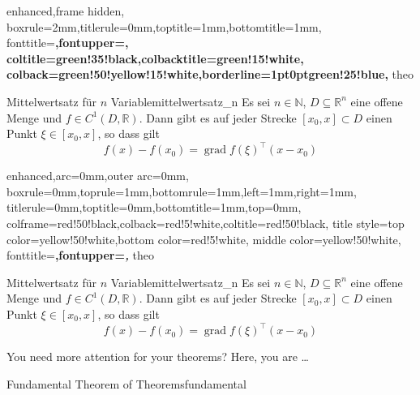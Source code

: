 \begin{dispExample}
%
  {enhanced,frame hidden,
  boxrule=2mm,titlerule=0mm,toptitle=1mm,bottomtitle=1mm,
  fonttitle=\bfseries\large,fontupper=\normalsize,
  coltitle=green!35!black,colbacktitle=green!15!white,
  colback=green!50!yellow!15!white,borderline={1pt}{0pt}{green!25!blue},
  }{theo}

\begin{YetAnotherTheorem}{Mittelwertsatz f\"{u}r $n$ Variable}{mittelwertsatz_n}%
  Es sei $n\in\mathbb{N}$, $D\subseteq\mathbb{R}^n$ eine offene Menge und
  $f\in C^{1}(D,\mathbb{R})$. Dann gibt es auf jeder Strecke
  $[x_0,x]\subset D$ einen Punkt $\xi\in[x_0,x]$, so dass gilt
  \begin{equation*}
  f(x)-f(x_0) = \operatorname{grad} f(\xi)^{\top}(x-x_0)
  \end{equation*}
\end{YetAnotherTheorem}
\end{dispExample}


\begin{dispExample}
%
  {enhanced,arc=0mm,outer arc=0mm,
  boxrule=0mm,toprule=1mm,bottomrule=1mm,left=1mm,right=1mm,
  titlerule=0mm,toptitle=0mm,bottomtitle=1mm,top=0mm,
  colframe=red!50!black,colback=red!5!white,coltitle=red!50!black,
  title style={top color=yellow!50!white,bottom color=red!5!white,
    middle color=yellow!50!white},
  fonttitle=\bfseries\sffamily\normalsize,fontupper=\normalsize\itshape,
  }{theo}

\begin{YetAnotherTheorem}{Mittelwertsatz f\"{u}r $n$ Variable}{mittelwertsatz_n}%
  Es sei $n\in\mathbb{N}$, $D\subseteq\mathbb{R}^n$ eine offene Menge und
  $f\in C^{1}(D,\mathbb{R})$. Dann gibt es auf jeder Strecke
  $[x_0,x]\subset D$ einen Punkt $\xi\in[x_0,x]$, so dass gilt
  \begin{equation*}
  f(x)-f(x_0) = \operatorname{grad} f(\xi)^{\top}(x-x_0)
  \end{equation*}
\end{YetAnotherTheorem}
\end{dispExample}



You need more attention for your theorems? Here, you are \ldots

\begin{dispExample}
\begin{Theorem}[enhanced,
    fuzzy halo=3mm with yellow,
    fuzzy halo=2mm with red,
    fuzzy halo=1mm with yellow,
    watermark color=red!35!white,
    watermark text={Overacting\\Fundamental Theorem}]%
  {Fundamental Theorem of Theorems}{fundamental}%
  \lipsum[1-2]
\end{Theorem}
\end{dispExample}

